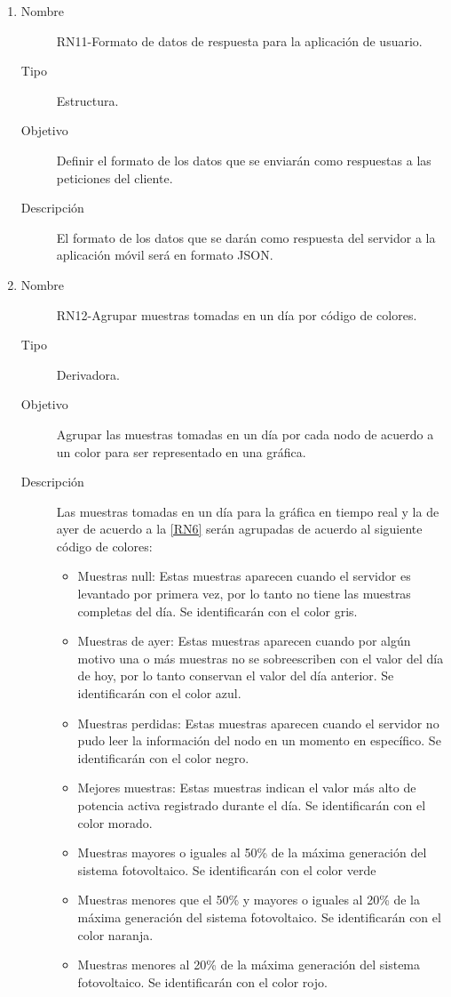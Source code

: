 \begin{enumerate}[label=RN\arabic*.]
\item \label{RN11}
		\begin{description}
			\item[Nombre] RN11-Formato de datos de respuesta para la aplicación de usuario.
			\item[Tipo] Estructura.
			\item[Objetivo] Definir el formato de los datos que se enviarán como respuestas a las peticiones del cliente.
			\item[Descripción] El formato de los datos que se darán como respuesta del servidor a la aplicación móvil será en formato JSON.
			\end{description}
			
\item \label{RN12}
		\begin{description}
			\item[Nombre] RN12-Agrupar muestras tomadas en un día por código de colores. 
			\item[Tipo] Derivadora.
			\item[Objetivo] Agrupar las muestras tomadas en un día por cada nodo de acuerdo a un color para ser representado en una gráfica.
			\item[Descripción] Las muestras tomadas en un día para la gráfica en tiempo real y la de ayer de acuerdo a la \ref{RN6} serán agrupadas de acuerdo al siguiente código de colores:
			\begin{itemize}
			    \item Muestras null: Estas muestras aparecen cuando el servidor es levantado por primera vez, por lo tanto no tiene las muestras completas del día. Se identificarán con el color gris.
			    \item Muestras de ayer: Estas muestras aparecen cuando por algún motivo una o más muestras no se sobreescriben con el valor del día de hoy, por lo tanto conservan el valor del día anterior. Se identificarán con el color azul.
			    \item Muestras perdidas: Estas muestras aparecen cuando el servidor no pudo leer la información del nodo en un momento en específico. Se identificarán con el color negro.
			    \item Mejores muestras: Estas muestras indican el valor más alto de potencia activa registrado durante el día. Se identificarán con el color morado.
			    \item Muestras mayores o iguales al 50\% de la máxima generación del sistema fotovoltaico. Se identificarán con el color verde  
				\item Muestras menores que el 50\% y mayores o iguales al 20\% de la máxima generación del sistema fotovoltaico. Se identificarán con el color naranja.
				\item Muestras menores al 20\% de la máxima generación del sistema fotovoltaico. Se identificarán con el color rojo.
			\end{itemize}
		\end{description}
	

\end{enumerate}

